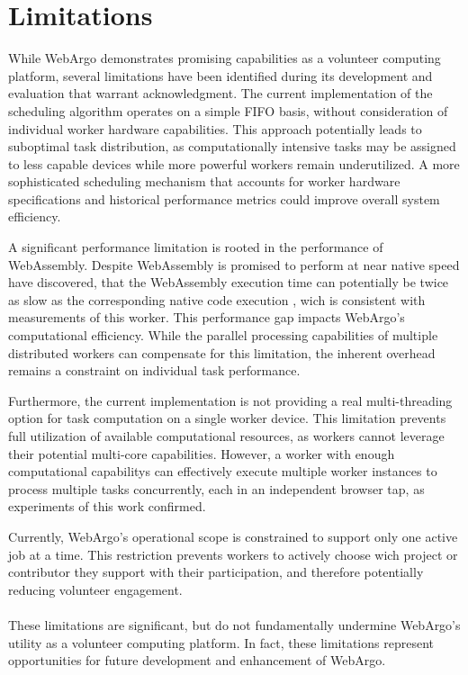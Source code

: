 \section{Limitations}
\label{sec:conclusion:limitations}
While WebArgo demonstrates promising capabilities as a volunteer computing platform, several limitations have been identified during its development and evaluation that warrant acknowledgment. The current implementation of the scheduling algorithm operates on a simple \ac{FIFO} basis, without consideration of individual worker hardware capabilities. This approach potentially leads to suboptimal task distribution, as computationally intensive tasks may be assigned to less capable devices while more powerful workers remain underutilized. A more sophisticated scheduling mechanism that accounts for worker hardware specifications and historical performance metrics could improve overall system efficiency.

A significant performance limitation is rooted in the performance of WebAssembly. Despite WebAssembly is promised to perform at near native speed \citeauthor{background:not-so-fast} have discovered, that the WebAssembly execution time can potentially be twice as slow as the corresponding native code execution \cite{background:not-so-fast}, wich is consistent with measurements of this worker. This performance gap impacts WebArgo's computational efficiency. While the parallel processing capabilities of multiple distributed workers can compensate for this limitation, the inherent overhead remains a constraint on individual task performance.

Furthermore, the current implementation is not providing a real multi-threading option for task computation on a single worker device. This limitation prevents full utilization of available computational resources, as workers cannot leverage their potential multi-core capabilities. However, a worker with enough computational capabilitys can effectively execute multiple worker instances to process multiple tasks concurrently, each in an independent browser tap, as experiments of this work confirmed.

Currently, WebArgo's operational scope is constrained to support only one active job at a time. This restriction prevents workers to actively choose wich project or contributor they support with their participation, and therefore potentially reducing volunteer engagement.
\\~\\
These limitations are significant, but do not fundamentally undermine WebArgo's utility as a volunteer computing platform. In fact, these limitations represent opportunities for future development and enhancement of WebArgo.


